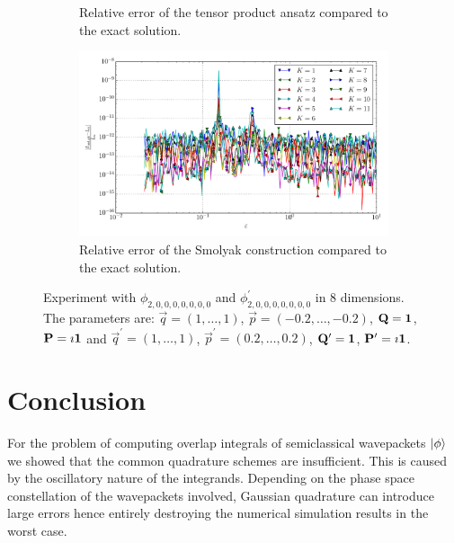 \documentclass[a4paper,10pt]{article}
\begin{document}
\begin{figure}[ht!]
\begin{subfigure}[t]{0.5\linewidth}
    \caption{Relative error of the tensor product ansatz compared to the exact solution.}
    \label{fig:tp_sg_8d_conv_p_20000000_20000000_err_rel_nsd_tp}
  \end{subfigure}
  \begin{subfigure}[t]{0.5\linewidth}
    \includegraphics[width=\linewidth]{./plots/tp_sg_8d_conv_eps_(2,0,0,0,0,0,0,0)_(2,0,0,0,0,0,0,0)_err_rel_nsd_gk.pdf}
    \caption{Relative error of the Smolyak construction compared to the exact solution.}
    \label{fig:tp_sg_8d_conv_p_20000000_20000000_err_rel_nsd_gk}
  \end{subfigure}
  \label{fig:tp_sg_8d_conv_p_20000000_20000000}
  \caption{Experiment with $\phi_{2,0,0,0,0,0,0,0}$ and $\phi_{2,0,0,0,0,0,0,0}^{\prime}$
  in 8 dimensions.
  The parameters are:
  $\vec{q} = (1, \ldots, 1)$,
  $\vec{p} = (-0.2, \ldots, -0.2)$,
  $\mathbf{Q} = \mathbf{1}$,
  $\mathbf{P} = \imath \mathbf{1}$
  and
  $\vec{q}^\prime = (1, \ldots, 1)$,
  $\vec{p}^\prime = (0.2, \ldots, 0.2)$,
  $\mathbf{Q}^\prime = \mathbf{1}$,
  $\mathbf{P}^\prime = \imath \mathbf{1}$.}
\end{figure}


\FloatBarrier
\section{Conclusion}

For the problem of computing overlap integrals of semiclassical wavepackets $\ket{\phi}$
we showed that the common quadrature schemes are insufficient. This is
caused by the oscillatory nature of the integrands. Depending on the phase space constellation
of the wavepackets involved, Gaussian quadrature can introduce large errors hence entirely
destroying the numerical simulation results in the worst case.
\end{document}
